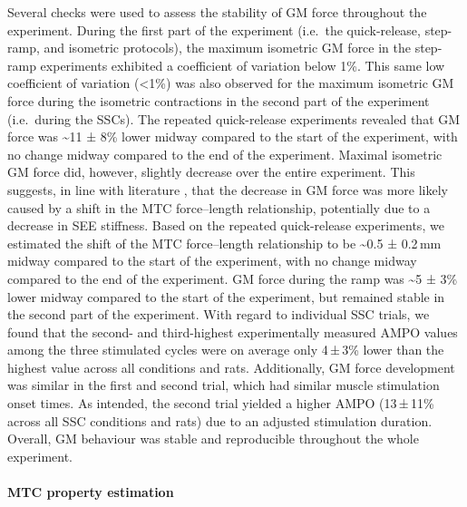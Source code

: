 \documentclass[
  10pt,
  letterpaper,
]{article}
\begin{document}
Several checks were used to assess the stability of GM force throughout
the experiment. During the first part of the experiment (i.e.~the
quick-release, step-ramp, and isometric protocols), the maximum
isometric GM force in the step-ramp experiments exhibited a coefficient
of variation below 1\%. This same low coefficient of variation
(\textless1\%) was also observed for the maximum isometric GM force
during the isometric contractions in the second part of the experiment
(i.e.~during the SSCs). The repeated quick-release experiments revealed
that GM force was \textasciitilde11 ± 8\% lower midway compared to the
start of the experiment, with no change midway compared to the end of
the experiment. Maximal isometric GM force did, however, slightly
decrease over the entire experiment. This suggests, in line with
literature \citep[e.g.][]{aubert_tension-length_1951}, that the decrease
in GM force was more likely caused by a shift in the MTC force--length
relationship, potentially due to a decrease in SEE stiffness. Based on
the repeated quick-release experiments, we estimated the shift of the
MTC force--length relationship to be \textasciitilde0.5 ± 0.2\,mm midway
compared to the start of the experiment, with no change midway compared
to the end of the experiment. GM force during the ramp was
\textasciitilde5 ± 3\% lower midway compared to the start of the
experiment, but remained stable in the second part of the experiment.
With regard to individual SSC trials, we found that the second- and
third-highest experimentally measured AMPO values among the three
stimulated cycles were on average only 4\,±\,3\% lower than the highest
value across all conditions and rats. Additionally, GM force development
was similar in the first and second trial, which had similar muscle
stimulation onset times. As intended, the second trial yielded a higher
AMPO (13\,±\,11\% across all SSC conditions and rats) due to an adjusted
stimulation duration. Overall, GM behaviour was stable and reproducible
throughout the whole experiment.

\paragraph{MTC property estimation}\label{mtc-property-estimation}
\end{document}
